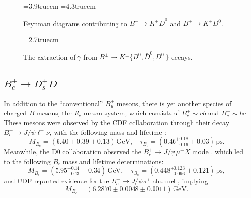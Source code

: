 \documentclass[11pt]{cernrep}
\begin{document}
\begin{figure}
\begin{center}
\leavevmode
\epsfysize=3.9truecm 
 \hspace*{1truecm}
\epsfysize=4.3truecm 
\end{center}
\vspace*{-0.4truecm}
\caption{Feynman diagrams contributing to $B^+\to K^+\bar D^0$ and 
$B^+\to K^+D^0$. }\label{fig:BDK}
\end{figure}


\begin{figure}
\vspace*{0.3truecm}
\begin{center}
\leavevmode
\epsfysize=2.7truecm 
\end{center}
\vspace*{-0.6truecm}
\caption{The extraction of $\gamma$ from 
$B^\pm\to K^\pm\{D^0,\bar D^0,D^0_+\}$ 
decays.}\label{fig:BDK-triangle}
\end{figure}



%
%
%
\boldmath
\subsection{$B_c^\pm\to D_s^\pm D$}
\unboldmath
%
%
%
In addition to the ``conventional'' $B_u^\pm$ mesons, there is yet another 
species of charged $B$ mesons, the $B_c$-meson system, which consists of
$B_c^+\sim c\overline{b}$ and $B_c^-\sim b\overline{c}$. These mesons were 
observed by the CDF collaboration through their decay 
$B_c^+\to J/\psi \ell^+ \nu$, with the following mass and lifetime 
\cite{CDF-Bc}:
\begin{equation}
M_{B_c}=(6.40\pm0.39\pm0.13)\,\mbox{GeV}, \quad
\tau_{B_c}=(0.46^{+0.18}_{-0.16}\pm 0.03)\,\mbox{ps}.
\end{equation}
Meanwhile, the D0 collaboration observed the $B_c^+\to J/\psi\,\mu^+ X$ mode
\cite{D0-Bc}, which led to the following $B_c$ mass and lifetime determinations:
\begin{equation}
M_{B_c}=(5.95^{+0.14}_{-0.13}\pm0.34)\,\mbox{GeV}, \quad
\tau_{B_c}=(0.448^{+0.123}_{-0.096}\pm 0.121)\,\mbox{ps},
\end{equation}
and CDF reported evidence for the $B_c^+\to J/\psi \pi^+$ channel \cite{CDF-Bc-nl},
implying
\begin{equation}
M_{B_c}= (6.2870 \pm 0.0048  \pm 0.0011)\,\mbox{GeV}.
\end{equation}
\end{document}
